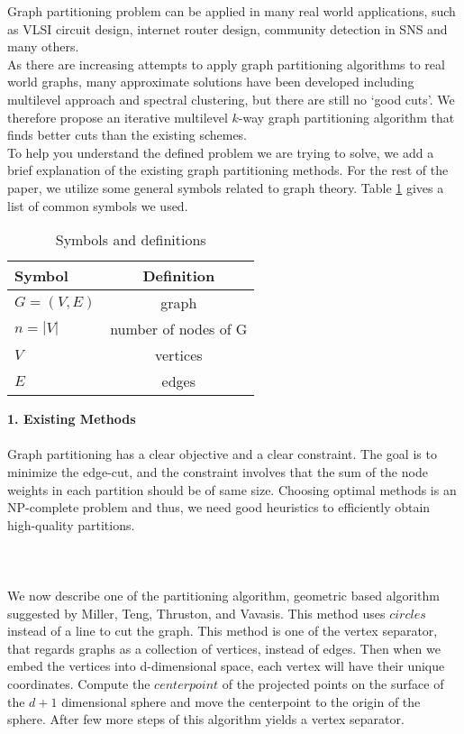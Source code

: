 Graph partitioning problem can be applied in many real world applications, such as VLSI circuit design, internet router design, community detection in SNS and many others. \\ As there are increasing attempts to apply graph partitioning algorithms to real world graphs, many approximate solutions have been developed including multilevel approach and spectral clustering, but there are still no `good cuts'. We therefore propose an iterative multilevel $k$-way graph partitioning algorithm that finds better cuts than the existing schemes.\\
To help you understand the defined problem we are trying to solve, we add a brief explanation of the existing graph partitioning methods. For the rest of the paper, we utilize some general symbols related to graph theory. Table \ref{tab:symbols} gives a list of common symbols we used. \\

\begin{table}[htb]
\begin{center}
\begin{tabular}{|l | c | } \hline \hline
Symbol & Definition \\ \hline
$G = (V,E)$ & graph \\
$n = |V|$ & number of nodes of G \\
$V$ & vertices \\
$E$  & edges \\ 
\hline
\end{tabular}
\end{center}
\caption{Symbols and definitions}
\label{tab:symbols}
 \end{table}


\textbf{1. Existing Methods}\\ \\
Graph partitioning has a clear objective and a clear constraint. The goal is to minimize the edge-cut, and the constraint involves that the sum of the node weights in each partition should be of same size. Choosing optimal methods is an NP-complete problem and thus, we need good heuristics to efficiently obtain high-quality partitions.\\ \\

\\\\
We now describe one of the partitioning algorithm, geometric based algorithm suggested by Miller, Teng, Thruston, and Vavasis. This method uses $circles$ instead of a line to cut the graph. This method is one of the vertex separator, that regards graphs as a collection of vertices, instead of edges. Then when we embed the vertices into d-dimensional space, each vertex will have their unique coordinates. Compute the $centerpoint$ of the projected points on the surface of the $d+1$ dimensional sphere and move the centerpoint to the origin of the sphere. After few more steps of this algorithm yields a vertex separator. \\\



